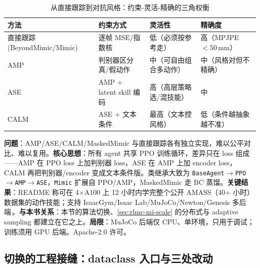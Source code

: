 \begin{table}[ht]
\centering
\small
\caption{从直接跟踪到对抗风格：约束-灵活-精确的三角权衡}
\label{tab:rlmc-mi-prior}
\begin{tabular}{@{}llll@{}}
\toprule
方法 & 约束方式 & 灵活性 & 精确度 \\
\midrule
直接跟踪 (BeyondMimic/Mimic) & 逐帧 MSE/指数核 & 低（必须按参考走） & 高（MPJPE $<50$\,mm） \\
AMP\,\cite{peng2021amp} & 判别器区分真/假动作 & 中（可自由组合多动作） & 中（风格对但不精确） \\
ASE\,\cite{peng2022ase} & AMP + latent skill 编码 & 高（高层策略选/混技能） & 中 \\
CALM\,\cite{tessler2023calm} & ASE + 文本条件 & 最高（文本控风格） & 低（条件越抽象越不准） \\
\bottomrule
\end{tabular}
\end{table}

\begin{paper}\label{paper:rlmc-mi-proto}
\textbf{问题}：AMP/ASE/CALM/MaskedMimic 与直接跟踪各有独立实现，难以公平对比、难以复用。\textbf{核心思想}：所有 agent 共享 PPO 训练循环，差异只在 loss 组成——AMP 在 PPO loss 上加判别器 loss，ASE 在 AMP 上加 encoder loss，CALM 再把判别器/encoder 变成文本条件版。类继承大致为 \verb|BaseAgent|$\to$\verb|PPO|$\to$\verb|AMP|$\to$\verb|ASE|，\verb|Mimic| 扩展自 PPO/AMP，MaskedMimic 走 BC 蒸馏。\textbf{关键结果}：README 称可在 4$\times$A100 上 12 小时内学完整个公开 AMASS（40+ 小时）数据集的动作技能；支持 IsaacGym/Isaac Lab/MuJoCo/Newton/Genesis 多后端\,\cite{protomotions2024}。\textbf{与本书关系}：本节的算法切换、\cref{sec:rlmc-mi-scale} 的分布式与 adaptive sampling 都建立在它之上。\textbf{局限}：MuJoCo 后端仅 CPU、单环境，只用于调试；训练须用 GPU 后端。Apache-2.0 许可。
\end{paper}

\subsection{切换的工程接缝：dataclass 入口与三处改动}
\label{sec:rlmc-mi-proto-switch}


